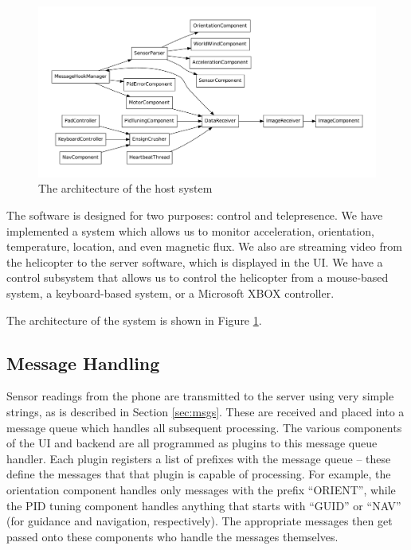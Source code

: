\documentclass[letterpaper]{article}
\newcommand\figref[1]{Figure \ref{fig:#1}}
\begin{document}
\begin{landscape}
  \begin{figure}[h]
    \centering
    \includegraphics[scale=.5]{figures/hostarch}
    \caption{The architecture of the host system}
    \label{fig:hostarch}
  \end{figure}
\end{landscape}

The software is designed for two purposes: control and
telepresence. We have implemented a system which allows us to monitor
acceleration, orientation, temperature, location, and even magnetic
flux. We also are streaming video from the helicopter to the server
software, which is displayed in the UI. We have a control subsystem
that allows us to control the helicopter from a mouse-based system, a
keyboard-based system, or a Microsoft XBOX controller. 

The architecture of the system is shown in \figref{hostarch}.

\subsection{Message Handling}
Sensor readings from the phone are transmitted to the server using
very simple strings, as is described in Section \ref{sec:msgs}. These
are received and placed into a message queue which handles all
subsequent processing. The various components of the UI and backend
are all programmed as plugins to this message queue handler. Each
plugin registers a list of prefixes with the message queue -- these
define the messages that that plugin is capable of processing. For
example, the orientation component handles only messages with the
prefix ``ORIENT'', while the PID tuning component handles anything
that starts with ``GUID'' or ``NAV'' (for guidance and navigation,
respectively). The appropriate messages then get passed onto these
components who handle the messages themselves.
\end{document}
